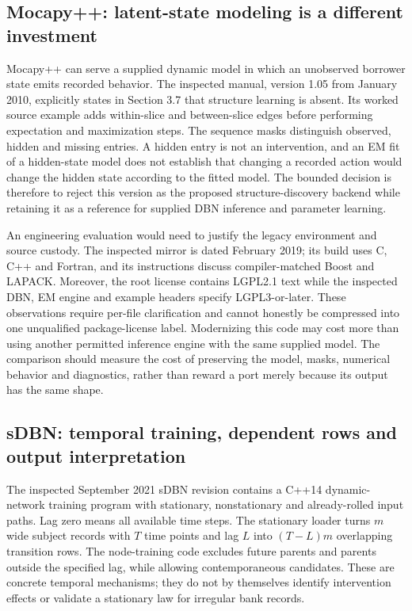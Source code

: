 \subsection{Mocapy++: latent-state modeling is a different investment}

Mocapy++ can serve a supplied dynamic model in which an unobserved borrower
state emits recorded behavior. The inspected manual, version 1.05 from January
2010, explicitly states in Section 3.7 that structure learning is absent.
Its worked source example adds within-slice and between-slice edges before
performing expectation and maximization steps. The sequence masks distinguish
observed, hidden and missing entries. A hidden entry is not an intervention,
and an EM fit of a hidden-state model does not establish that changing a
recorded action would change the hidden state according to the fitted model.
The bounded decision is therefore to reject this version as the proposed
structure-discovery backend while retaining it as a reference for supplied
DBN inference and parameter learning. \citep{exec16_ct_mocapy}

An engineering evaluation would need to justify the legacy environment and
source custody. The inspected mirror is dated February 2019; its build uses
C, C++ and Fortran, and its instructions discuss compiler-matched Boost and
LAPACK. Moreover, the root license contains LGPL2.1 text while the inspected
DBN, EM engine and example headers specify LGPL3-or-later. These observations
require per-file clarification and cannot honestly be compressed into one
unqualified package-license label. Modernizing this code may cost more than
using another permitted inference engine with the same supplied model. The
comparison should measure the cost of preserving the model, masks, numerical
behavior and diagnostics, rather than reward a port merely because its output
has the same shape. \citep{exec16_ct_mocapy,exec16_ct_design}

\subsection{sDBN: temporal training, dependent rows and output interpretation}

The inspected September 2021 sDBN revision contains a C++14 dynamic-network
training program with stationary, nonstationary and already-rolled input
paths. Lag zero means all available time steps. The stationary loader turns
$m$ wide subject records with $T$ time points and lag $L$ into
$(T-L)m$ overlapping transition rows. The node-training code excludes future
parents and parents outside the specified lag, while allowing contemporaneous
candidates. These are concrete temporal mechanisms; they do not by themselves
identify intervention effects or validate a stationary law for irregular bank
records. \citep{exec16_ct_sdbn}

